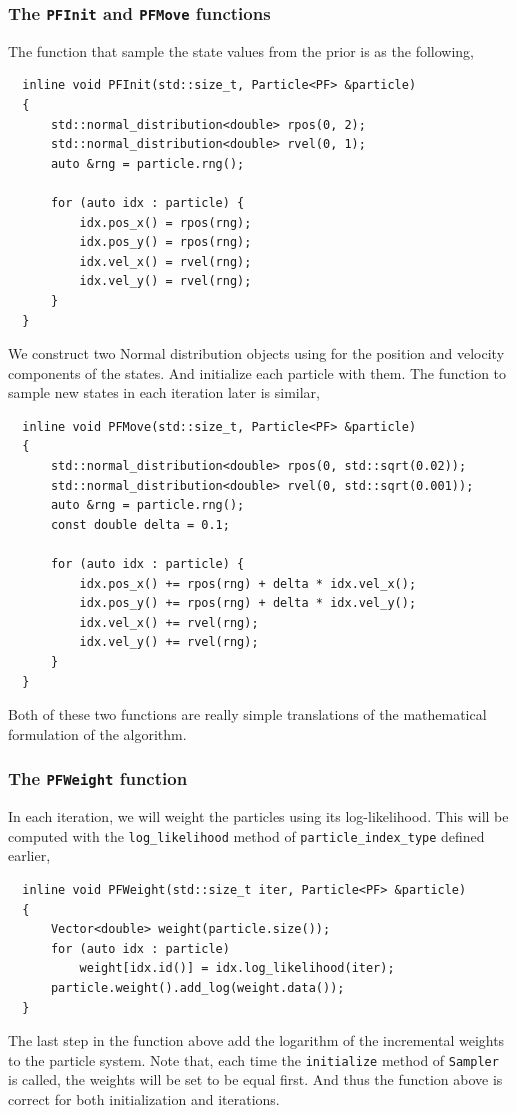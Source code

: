 \subsubsection{The \texttt{PFInit} and \texttt{PFMove} functions}

The function that sample the state values from the prior is as the following,
\begin{Verbatim}
  inline void PFInit(std::size_t, Particle<PF> &particle)
  {
      std::normal_distribution<double> rpos(0, 2);
      std::normal_distribution<double> rvel(0, 1);
      auto &rng = particle.rng();

      for (auto idx : particle) {
          idx.pos_x() = rpos(rng);
          idx.pos_y() = rpos(rng);
          idx.vel_x() = rvel(rng);
          idx.vel_y() = rvel(rng);
      }
  }
\end{Verbatim}
We construct two Normal distribution objects using for the position and
velocity components of the states. And initialize each particle with them. The
function to sample new states in each iteration later is similar,
\begin{Verbatim}
  inline void PFMove(std::size_t, Particle<PF> &particle)
  {
      std::normal_distribution<double> rpos(0, std::sqrt(0.02));
      std::normal_distribution<double> rvel(0, std::sqrt(0.001));
      auto &rng = particle.rng();
      const double delta = 0.1;

      for (auto idx : particle) {
          idx.pos_x() += rpos(rng) + delta * idx.vel_x();
          idx.pos_y() += rpos(rng) + delta * idx.vel_y();
          idx.vel_x() += rvel(rng);
          idx.vel_y() += rvel(rng);
      }
  }
\end{Verbatim}
Both of these two functions are really simple translations of the mathematical
formulation of the algorithm.

\subsubsection{The \texttt{PFWeight} function}

In each iteration, we will weight the particles using its log-likelihood. This
will be computed with the \verb|log_likelihood| method of
\verb|particle_index_type| defined earlier,
\begin{Verbatim}
  inline void PFWeight(std::size_t iter, Particle<PF> &particle)
  {
      Vector<double> weight(particle.size());
      for (auto idx : particle)
          weight[idx.id()] = idx.log_likelihood(iter);
      particle.weight().add_log(weight.data());
  }
\end{Verbatim}
The last step in the function above add the logarithm of the incremental
weights to the particle system. Note that, each time the \verb|initialize|
method of \verb|Sampler| is called, the weights will be set to be equal first.
And thus the function above is correct for both initialization and iterations.

